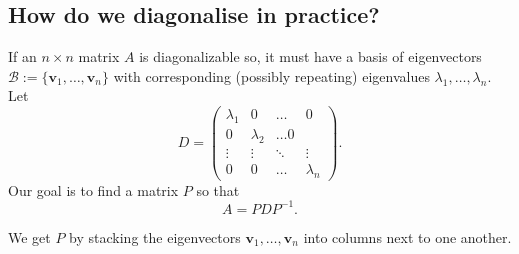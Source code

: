 \documentclass[12pt, a4paper]{article}
\newcommand{\Cal}[1]{\mathcal{#1}}
\theoremstyle{definition}
\theoremstyle{plain}
\begin{document}
\subsection{How do we diagonalise in practice?}

If an $n\times n$ matrix $A$ is diagonalizable so, it must have a basis of eigenvectors $\Cal{B} := \{\mathbf{v}_1, \ldots, \mathbf{v}_n\}$ with corresponding (possibly repeating) eigenvalues $\lambda_1,\ldots, \lambda_n.$ Let $$D=\begin{pmatrix} \lambda_1 & 0 & \ldots & 0 \\ 0 & \lambda_2 & \ldots 0 \\ \vdots & \vdots & \ddots & \vdots \\ 0 & 0& \ldots & \lambda_n \end{pmatrix}.$$ Our goal is to find a matrix $P$ so that $$A=PDP^{-1}.$$

\begin{tcolorbox}
We get $P$ by stacking the eigenvectors $\mathbf{v}_1,\ldots,\mathbf{v}_n$ into columns next to one another.
\end{tcolorbox}
\end{document}
